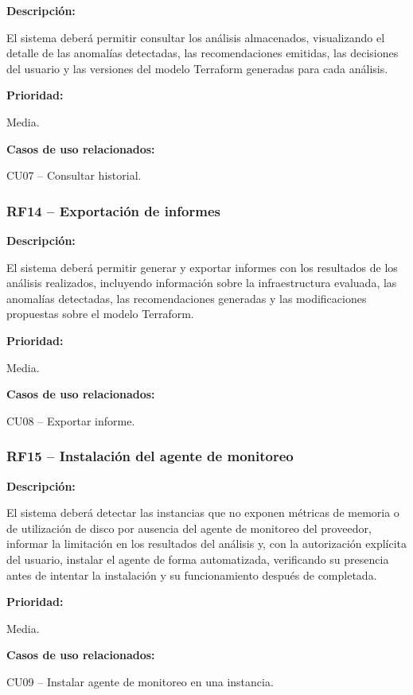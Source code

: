 \noindent \textbf{Descripción:}

El sistema deberá permitir consultar los análisis almacenados, visualizando el detalle de las anomalías detectadas, las recomendaciones emitidas, las decisiones del usuario y las versiones del modelo Terraform generadas para cada análisis.

\noindent \textbf{Prioridad:}

Media.

\noindent \textbf{Casos de uso relacionados:}

\noindent CU07 -- Consultar historial.

\subsubsection{RF14 -- Exportación de informes}

\noindent \textbf{Descripción:}

El sistema deberá permitir generar y exportar informes con los resultados de los análisis realizados, incluyendo información sobre la infraestructura evaluada, las anomalías detectadas, las recomendaciones generadas y las modificaciones propuestas sobre el modelo Terraform.

\noindent \textbf{Prioridad:}

Media.

\noindent \textbf{Casos de uso relacionados:}

\noindent CU08 -- Exportar informe.

\subsubsection{RF15 -- Instalación del agente de monitoreo}

\noindent \textbf{Descripción:}

El sistema deberá detectar las instancias que no exponen métricas de memoria o de utilización de disco por ausencia del agente de monitoreo del proveedor, informar la limitación en los resultados del análisis y, con la autorización explícita del usuario, instalar el agente de forma automatizada, verificando su presencia antes de intentar la instalación y su funcionamiento después de completada.

\noindent \textbf{Prioridad:}

Media.

\noindent \textbf{Casos de uso relacionados:}

\noindent CU09 -- Instalar agente de monitoreo en una instancia.

